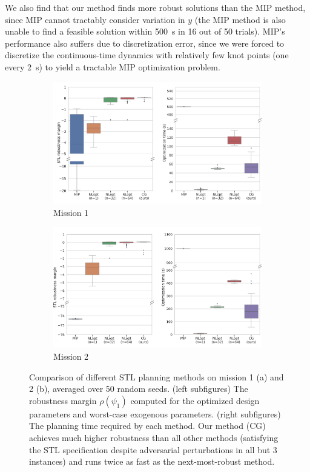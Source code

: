 We also find that our method finds more robust solutions than the MIP method, since MIP cannot tractably consider variation in $y$ (the MIP method is also unable to find a feasible solution within \SI{500}{s} in 16 out of 50 trials). MIP's performance also suffers due to discretization error, since we were forced to discretize the continuous-time dynamics with relatively few knot points (one every \SI{2}{s}) to yield a tractable MIP optimization problem.


\begin{figure}[t]
    \centering
    \begin{subfigure}[t]{0.45\linewidth}
        \centering
        \includegraphics[width=\linewidth]{images/local_methods/mission_1_comparison.png}
        \caption{Mission 1}
    \end{subfigure}
    \begin{subfigure}[t]{0.45\linewidth}
        \centering
        \includegraphics[width=\linewidth]{images/local_methods/mission_2_comparison.png}
        \caption{Mission 2}
    \end{subfigure}%
    \caption{Comparison of different STL planning methods on mission 1 (a) and 2 (b), averaged over 50 random seeds. (left subfigures) The robustness margin $\rho(\psi_1)$ computed for the optimized design parameters and worst-case exogenous parameters. (right subfigures) The planning time required by each method. Our method (CG) achieves much higher robustness than all other methods (satisfying the STL specification despite adversarial perturbations in all but 3 instances) and runs twice as fast as the next-most-robust method.}
    \label{local:fig:stl_comparisons}
\end{figure}

